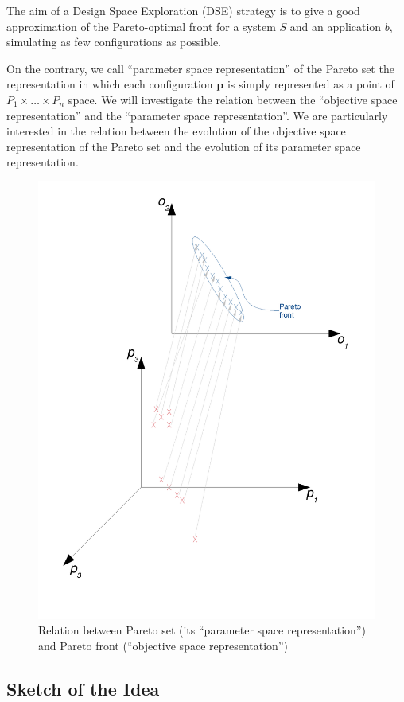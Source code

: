 The aim of a Design Space Exploration (DSE) strategy is to give a
good approximation of the Pareto-optimal front for a system $S$ and an
application $b$, simulating as few configurations as possible.



On the contrary, we call ``parameter space representation'' of the
Pareto set the representation in which each configuration $\mathbf{p}$
is simply represented as a point of $P_{1}\times\dots\times P_{n}$
space. We will investigate the relation between the ``objective space
representation'' and the ``parameter space representation''. We
are particularly interested in the relation between the evolution
of the objective space representation of the Pareto set and the evolution
of its parameter space representation.

\begin{figure}[h]
\includegraphics[width=0.5\columnwidth]{img/Pareto_set_and_front}
\caption{Relation between Pareto set (its ``parameter space representation'')
and Pareto front (``objective space representation'')}
\end{figure}

\subsection{Sketch of the Idea}

